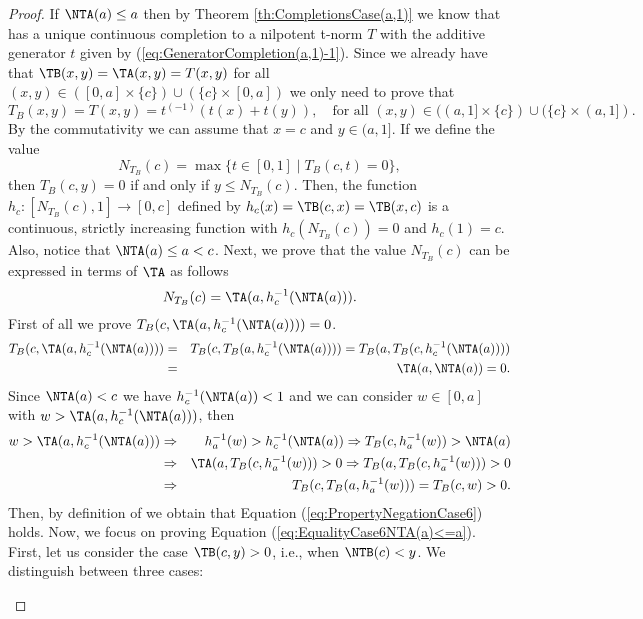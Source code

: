\begin{proof}
	If $\NTA(a) \leq a$ then by Theorem \ref{th:CompletionsCase(a,1)} we know that \TA has a unique continuous completion to a nilpotent t-norm $T$ with the additive generator $t$ given by (\ref{eq:GeneratorCompletion(a,1)-1}). Since we already have that $\TB(x,y)=\TA(x,y)=T(x,y)$ for all  $(x,y) \in ([0,a] \times \{c\}) \cup (\{c\} \times [0,a])$ we only need to prove that
	\begin{equation}\label{eq:EqualityCase6NTA(a)<=a}
		T_B(x,y)=T(x,y)=t^{(-1)}(t(x)+t(y)), \quad \text{for all } (x,y) \in ((a,1] \times \{c\}) \cup (\{c\} \times (a,1]).
	\end{equation}
	By the commutativity we can assume that $x=c$ and $y \in (a,1]$. If we define the value
	$$N_{T_B}(c)= \max \{t \in [0,1] \mid T_B(c,t)=0\},$$
	then $T_B(c,y)=0$ if and only if $y \leq N_{T_B}(c)$. Then, the function $h_c : [N_{T_B}(c),1] \to [0,c]$ defined by $h_c(x)=\TB(c,x)=\TB(x,c)$ is a continuous, strictly increasing function with $h_c(N_{T_B}(c))=0$ and $h_c(1)=c$. Also, notice that $\NTA(a) \leq a <c$. Next, we prove that the value $N_{T_B}(c)$ can be expressed in terms of $\TA$ as follows
	\begin{equation}\label{eq:PropertyNegationCase6}
		N_{T_B}(c)=\TA(a,h_c^{-1}(\NTA(a))).
	\end{equation}
	First of all we prove $T_B(c,\TA(a,h_c^{-1}(\NTA(a))))=0$.
	\begin{eqnarray*}
	T_B(c,\TA(a,h_c^{-1}(\NTA(a)))) & = &T_B(c,T_B(a,h_c^{-1}(\NTA(a)))) = T_B(a,T_B(c,h_c^{-1}(\NTA(a))))\\
	& = & \TA(a,\NTA(a))=0.
	\end{eqnarray*}
	Since $\NTA(a)<c$ we have $h_c^{-1}(\NTA(a))<1$ and we can consider $w \in [0,a]$ with $w> \TA(a,h_c^{-1}(\NTA(a)))$,  then
	\begin{eqnarray*}
		w> \TA(a,h_c^{-1}(\NTA(a))) & \Rightarrow &	h_a^{-1}(w) > h_c^{-1}(\NTA(a)) \Rightarrow T_B(c,h_a^{-1}(w))> \NTA(a) \\
		& \Rightarrow & \TA(a,T_B(c,h_a^{-1}(w))) > 0 \Rightarrow T_B(a,T_B(c,h_a^{-1}(w)))>0 \\
		&\Rightarrow & T_B(c,T_B(a,h_a^{-1}(w))) = T_B(c,w)>0.
	\end{eqnarray*}
	Then, by definition of \NTB we obtain that Equation (\ref{eq:PropertyNegationCase6}) holds. Now, we focus on proving Equation (\ref{eq:EqualityCase6NTA(a)<=a}). First, let us consider the case $\TB(c,y)>0$, i.e.,  when $\NTB(c)<y$. We distinguish between three cases:
	\begin{itemize}

\end{itemize}
\end{proof}

